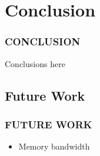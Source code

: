 
\section{Conclusion}
\begin{frame}
\frametitle{CONCLUSION}

Conclusions here

\end{frame}

\subsection{Future Work}
\begin{frame}
\frametitle{FUTURE WORK}

\begin{itemize}
\item Memory bandwidth
\end{itemize}

\end{frame}
